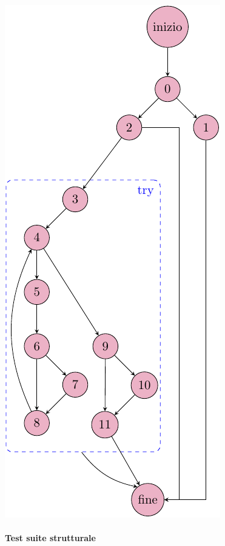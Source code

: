 \noindent\begin{minipage}[t]{0.38\linewidth}
	\vspace{0pt}
	\includegraphics{chapters/testing_white_box/cfg_creaOrdine.pdf}
\end{minipage}

\vfill
\pagebreak

\paragraph{Test suite strutturale}\mbox{}\newline

